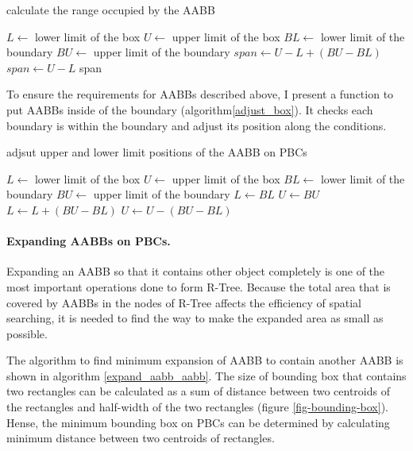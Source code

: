 \documentclass[10pt,letterpaper,twocolumn]{article}
\begin{document}
\begin{algorithm}
    \caption{calculate the range occupied by the AABB}
    \label{span}
    \begin{algorithmic}
        \State $L  \gets$ lower limit of the box
        \State $U  \gets$ upper limit of the box
        \State $BL \gets$ lower limit of the boundary
        \State $BU \gets$ upper limit of the boundary
                \State $span \gets U - L + (BU - BL)$
            \Else
                \State $span \gets U - L$
            \EndIf
            \State \Return span
        \EndFunction
    \end{algorithmic}
\end{algorithm}

To ensure the requirements for AABBs described above, I present a function to
put AABBs inside of the boundary (algorithm\ref{adjust_box}). It checks each
boundary is within the boundary and adjust its position along the conditions.

\begin{algorithm}
    \caption{adjsut upper and lower limit positions of the AABB on PBCs}
    \label{adjust_box}
    \begin{algorithmic}
        \State $L  \gets$ lower limit of the box
        \State $U  \gets$ upper limit of the box
        \State $BL \gets$ lower limit of the boundary
        \State $BU \gets$ upper limit of the boundary
                \State $L \gets BL$
                \State $U \gets BU$
                \State $L \gets L + (BU - BL)$
                \State $U \gets U - (BU - BL)$
            \EndIf
            \State \Return
        \EndFunction
     \end{algorithmic}
\end{algorithm}

\paragraph{Expanding AABBs on PBCs.}
Expanding an AABB so that it contains other object completely is one of the most
important operations done to form R-Tree. Because the total area that is covered by
AABBs in the nodes of R-Tree affects the efficiency of spatial searching, it is
needed to find the way to make the expanded area as small as possible.

The algorithm to find minimum expansion of AABB to contain another AABB is shown
in algorithm \ref{expand_aabb_aabb}. The size of bounding box that contains two
rectangles can be calculated as a sum of distance between two centroids of the
rectangles and half-width of the two rectangles (figure \ref{fig-bounding-box}).
Hense, the minimum bounding box on PBCs can be determined by calculating
minimum distance between two centroids of rectangles.
\end{document}
